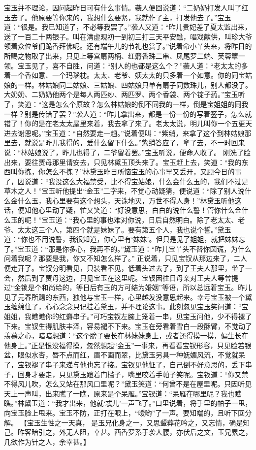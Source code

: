 \documentclass[12pt,oneside]{book}
\begin{document}
宝玉并不理论，因问起昨日可有什么事情。袭人便回说道：“二奶奶打发人叫了红玉去了。他原要等你来的，我想什么要紧，我就作了主，打发他去了。”宝玉道：“很是。我已知道了，不必等我罢了。”袭人又道：“昨儿贵妃差了夏太监出来，送了一百二十两银子。叫在清虚观初一到初三打三天平安醮，唱戏献供，叫珍大爷领着众位爷们跪香拜佛呢。还有端午儿的节礼也赏了。”说着命小丫头来，将昨日的所赐之物取了出来，只见上等宫扇两柄、红麝香珠二串、凤尾罗二端、芙蓉簟一领。宝玉见了，喜不自胜，问道：“别人的也都是这么个？”袭人道：“老太太的多着一个香如意、一个玛瑙枕。太太、老爷、姨太太的只多着一个如意。你的同宝姑娘的一样。林姑娘同二姑娘、三姑娘、四姑娘只单有扇子同数珠儿，别人都没了。大奶奶、二奶奶他两个是每人两匹纱、两匹罗、两个香袋、两个锭子药。”宝玉听了，笑道：“这是怎么个原故？怎么林姑娘的倒不同我的一样，倒是宝姐姐的同我一样？别是传错了罢？”袭人道：“昨儿拿出来，都是一份一份的写着签子，怎么就错了！你的是在老太太屋里来着，我去拿了来了。老太太说，明儿叫你一个五更天进去谢恩呢。”宝玉道：“自然要走一趟。”说着便叫：“紫绡，来拿了这个到林姑娘那里去，就说是昨儿我得的，爱什么留下什么。”紫绡答应了，拿了去，不一时回来说：“林姑娘说了，昨儿也得了，二爷留着罢。”宝玉听说，便命人收了。
刚洗了脸出来，要往贾母那里请安去，只见林黛玉顶头来了。宝玉赶上去，笑道：“我的东西叫你拣，你怎么不拣？”林黛玉昨日所恼宝玉的心事早又丢开，又顾今日的事了，因说道：“我没这么大福禁受，比不得宝姑娘，什么金什么玉的，我们不过是草木之人！”宝玉听他提出“金玉”二字来，不觉心动疑猜，便说道：“除了别人说什么金什么玉，我心里要有这个想头，天诛地灭，万世不得人身！”林黛玉听他这话，便知他心里动了疑，忙又笑道：“好没意思，白白的说什么誓！管你什么金什么玉的呢！”宝玉道：“我心里的事也难对你说，日后自然明白。除了老太太、老爷、太太这三个人，第四个就是妹妹了。要有第五个人，我也说个誓。”黛玉道：“你也不用说誓，我很知道，你心里有‘妹妹’。但只是见了姐姐，就把妹妹忘了。”宝玉道：“那是你多心，我再不的。”黛玉道：“昨儿宝丫头不替你圆谎，为什么问着我呢？那要是我，你又不知怎么样了。”
正说着，只见宝钗从那边来了，二人便走开了。宝钗分明看见，只装看不见，低着头过去了，到了王夫人那里，坐了一会，然后到了贾母这边，只见宝玉在这里呢。宝钗因往日母亲对王夫人等曾提过“金锁是个和尚给的，等日后有玉的方可结为婚姻”等语，所以总远着宝玉。昨儿见了元春所赐的东西，独他与宝玉一样，心里越发没意思起来。幸亏宝玉被一个黛玉缠绵住了，心心念念只记挂着黛玉，并不理论这事。此刻忽见宝玉笑问道：“宝姐姐，我瞧瞧你的红麝串子。”可巧宝钗左腕上笼着一串，见宝玉问他，少不得褪了下来。宝钗生得肌肤丰泽，容易褪不下来。宝玉在旁看着雪白一段酥臂，不觉动了羡慕之心，暗暗想道：“这个膀子要长在林妹妹身上，或者还得摸一摸，偏生长在他身上。”正是恨没福得摸，忽然想起“金玉”一事来，再看看宝钗形容，只见脸若银盆，眼似水杏，唇不点而红，眉不画而翠，比黛玉另具一种妩媚风流，不觉就呆了，宝钗褪了串子来递与他也忘了接。宝钗见他怔了，自己倒不好意思的，丢下串子，回身才要走，只见黛玉蹬着门槛子，嘴里咬着手帕子笑呢。宝钗道：“你又禁不得风儿吹，怎么又站在那风口里呢？”黛玉笑道：“何曾不是在屋里呢。只因听见天上一声叫，出来瞧了一瞧，原来是个呆雁。”宝钗道：“呆雁在哪里呢？我也瞧瞧。”林黛玉道：“我才出来，他就‘忒儿’一声飞了。”口里说着，将手里的帕子一甩，向宝玉脸上甩来。宝玉不防，正打在眼上，“嗳哟”了一声。要知端的，且听下回分解。
【宝玉生性之一天真， 是玉兄化身之一，又思颦葬花吟之，又忘情，确是知己。昨客暗引之，外无人阻，幸甚。西香罗系于袭人腰，亦伏后之文，玉兄累之，几欲作为针之人，余幸甚。】
\end{document}
